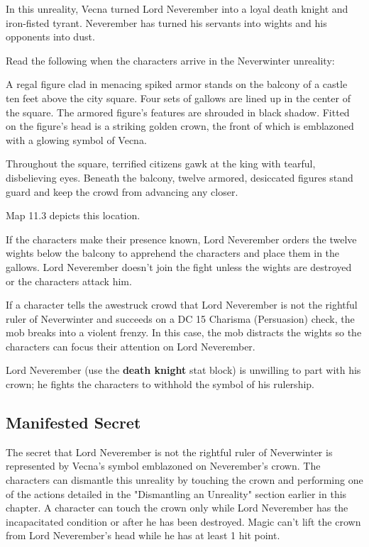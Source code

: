 \documentclass[10pt,a4paper,twoside,bg=print,twocolumn,openany,nodeprecatedcode]{dndbook}
\begin{document}
In this unreality, Vecna turned Lord Neverember into a loyal death knight and iron-fisted tyrant. Neverember has turned his servants into wights and his opponents into dust.

Read the following when the characters arrive in the Neverwinter unreality:

\begin{DndReadAloud}{}
A regal figure clad in menacing spiked armor stands on the balcony of a castle ten feet above the city square. Four sets of gallows are lined up in the center of the square. The armored figure's features are shrouded in black shadow. Fitted on the figure's head is a striking golden crown, the front of which is emblazoned with a glowing symbol of Vecna.

Throughout the square, terrified citizens gawk at the king with tearful, disbelieving eyes. Beneath the balcony, twelve armored, desiccated figures stand guard and keep the crowd from advancing any closer.

\end{DndReadAloud}

Map 11.3 depicts this location.

If the characters make their presence known, Lord Neverember orders the twelve wights below the balcony to apprehend the characters and place them in the gallows. Lord Neverember doesn't join the fight unless the wights are destroyed or the characters attack him.

If a character tells the awestruck crowd that Lord Neverember is not the rightful ruler of Neverwinter and succeeds on a DC 15 Charisma (Persuasion) check, the mob breaks into a violent frenzy. In this case, the mob distracts the wights so the characters can focus their attention on Lord Neverember.

Lord Neverember (use the \textbf{death knight} stat block) is unwilling to part with his crown; he fights the characters to withhold the symbol of his rulership.

\subsection{Manifested Secret}
The secret that Lord Neverember is not the rightful ruler of Neverwinter is represented by Vecna's symbol emblazoned on Neverember's crown. The characters can dismantle this unreality by touching the crown and performing one of the actions detailed in the "Dismantling an Unreality" section earlier in this chapter. A character can touch the crown only while Lord Neverember has the incapacitated condition or after he has been destroyed. Magic can't lift the crown from Lord Neverember's head while he has at least 1 hit point.
\end{document}

